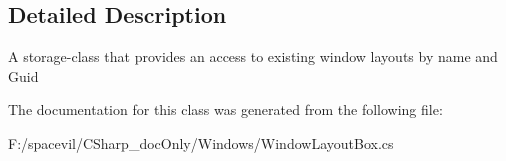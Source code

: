 \subsection{Detailed Description}
A storage-\/class that provides an access to existing window layouts by name and Guid 



The documentation for this class was generated from the following file\+:\begin{DoxyCompactItemize}
\item 
F\+:/spacevil/\+C\+Sharp\+\_\+doc\+Only/\+Windows/Window\+Layout\+Box.\+cs\end{DoxyCompactItemize}
